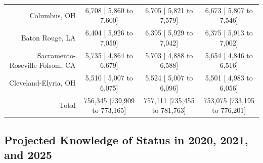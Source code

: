 \documentclass{article}
\begin{document}
\begin{table}[H]
\begin{tabular}{|r|c|c|c|}
		Columbus, OH &   6,708 [  5,860 to   7,600] &   6,705 [  5,821 to   7,579] &   6,673 [  5,807 to   7,546]\\
		Baton Rouge, LA &   6,404 [  5,926 to   7,059] &   6,395 [  5,929 to   7,042] &   6,375 [  5,913 to   7,002]\\
		Sacramento-Roseville-Folsom, CA &   5,735 [  4,864 to   6,679] &   5,703 [  4,888 to   6,588] &   5,654 [  4,846 to   6,516]\\
		Cleveland-Elyria, OH &   5,510 [  5,007 to   6,075] &   5,524 [  5,007 to   6,096] &   5,501 [  4,983 to   6,056]\\
		\hline
		Total & 756,345 [739,909 to 773,165] & 757,111 [735,455 to 781,763] & 753,075 [733,195 to 776,201]\\
		
		\hline
	\end{tabular}
\end{table}


\subsection{Projected Knowledge of Status in 2020, 2021, and 2025}
\end{document}
